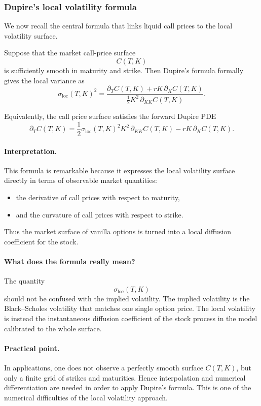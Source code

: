 \documentclass[11pt]{article}
\theoremstyle{plain}
\theoremstyle{definition}
\theoremstyle{remark}
\begin{document}
\subsubsection{Dupire's local volatility formula}

We now recall the central formula that links liquid call prices to the
local volatility surface.

Suppose that the market call-price surface
\[
C(T,K)
\]
is sufficiently smooth in maturity and strike.
Then Dupire's formula formally gives the local variance as
\[
\boxed{
\sigma_{\mathrm{loc}}(T,K)^2
=
\frac{
\partial_T C(T,K)+rK\,\partial_K C(T,K)
}{
\frac12 K^2\,\partial_{KK}C(T,K)
}.
}
\]

Equivalently, the call price surface satisfies the forward Dupire PDE
\[
\partial_T C(T,K)
=
\frac12 \sigma_{\mathrm{loc}}(T,K)^2K^2\,\partial_{KK}C(T,K)
-rK\,\partial_K C(T,K).
\]

\paragraph{Interpretation.}
This formula is remarkable because it expresses the local volatility
surface directly in terms of observable market quantities:
\begin{itemize}[leftmargin=1.4em]
    \item the derivative of call prices with respect to maturity,
    \item and the curvature of call prices with respect to strike.
\end{itemize}

Thus the market surface of vanilla options is turned into a local
diffusion coefficient for the stock.

\paragraph{What does the formula really mean?}
The quantity
\[
\sigma_{\mathrm{loc}}(T,K)
\]
should not be confused with the implied volatility.
The implied volatility is the Black--Scholes volatility that matches one
single option price.
The local volatility is instead the instantaneous diffusion coefficient
of the stock process in the model calibrated to the whole surface.

\paragraph{Practical point.}
In applications, one does not observe a perfectly smooth surface
\(C(T,K)\), but only a finite grid of strikes and maturities.
Hence interpolation and numerical differentiation are needed in order to
apply Dupire's formula.
This is one of the numerical difficulties of the local volatility
approach.
\end{document}
